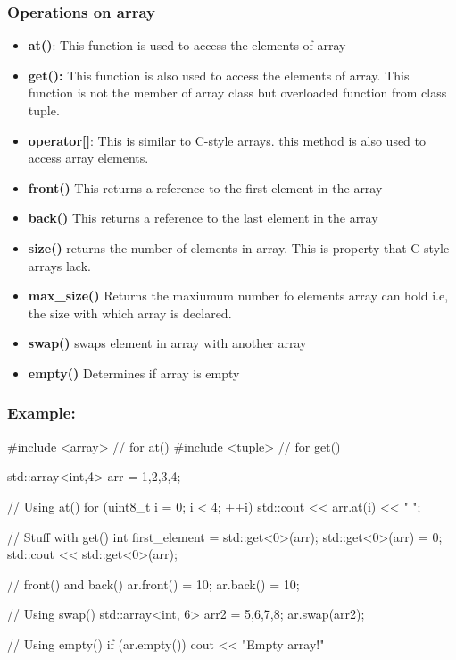 \documentclass{report}
\begin{document}
    \subsubsection*{Operations on array}
    \begin{itemize}
        \item \textbf{at()}: This function is used to access the elements of array 
        \item \textbf{get():} This function is also used to access the elements of array. This function is not the member of array class but overloaded function from class tuple. 
        \item \textbf{operator[]}: This is similar to C-style arrays. this method is also used to access array elements.
        \item \textbf{front()} This returns a reference to the first element in the array
        \item \textbf{back()} This returns a reference to the last element in the array
        \item \textbf{size()} returns the number of elements in array. This is property that C-style arrays lack.
        \item \textbf{max\_size()} Returns the maxiumum number fo elements array can hold i.e, the size with which array is declared. 
        \item \textbf{swap()} swaps element in array with another array
        \item \textbf{empty()} Determines if array is empty
    \end{itemize}
    \subsubsection*{Example:}
    \begin{cppcode}
    #include <array> // for at()
    #include <tuple> // for get()
    
    std::array<int,4> arr = {1,2,3,4};

    // Using at()
    for (uint8_t i = 0; i < 4; ++i) { std::cout << arr.at(i) << " ";}

    // Stuff with get() 
    int first_element = std::get<0>(arr);
    std::get<0>(arr) = 0;
    std::cout << std::get<0>(arr);

    // front() and back()
    ar.front() = 10;
    ar.back() = 10;
      
    // Using swap()
    std::array<int, 6> arr2 = {5,6,7,8};
    ar.swap(arr2);

    // Using empty()
    if (ar.empty()) { cout << "Empty array!"}
    \end{cppcode}
\end{document}
